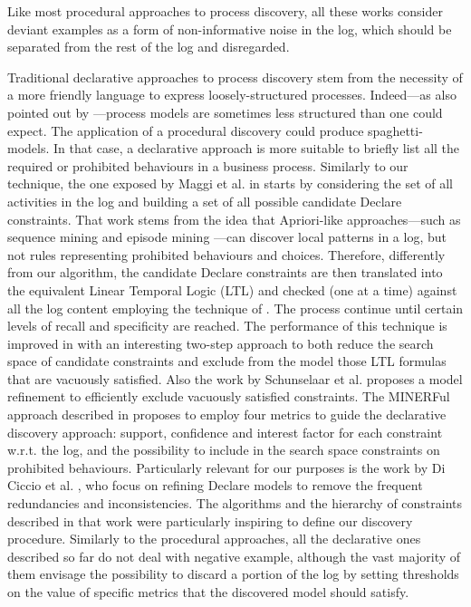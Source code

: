 Like most procedural approaches to process discovery, all these works consider deviant examples as a form of non-informative noise in the log, which should be separated from the rest of the log and disregarded.
 
Traditional declarative approaches to process discovery stem from the necessity of a more friendly language to express loosely-structured processes. Indeed---as also pointed out by \cite{2012-Maggi}---process models are sometimes less structured than one could expect. The application of a procedural discovery could produce spaghetti-models. In that case, a declarative approach is more suitable to briefly list all the required or prohibited behaviours in a business process.
Similarly to our technique, the one exposed by Maggi et al. in \cite{2011-Maggi} starts by considering the set of all activities in the log and building a set of all possible candidate Declare constraints. That work stems from the idea that Apriori-like approaches---such as sequence mining \cite{1994-Agrawal} and episode mining \cite{1997-Mannila}---can discover local patterns in a log, but not rules representing prohibited behaviours and choices. Therefore, differently from our algorithm, the candidate Declare constraints are then translated into the equivalent Linear Temporal Logic (LTL) and checked (one at a time) against all the log content employing the technique of \cite{2005-Aalst}. The process continue until certain levels of recall and specificity are reached. The performance of this technique is improved in \cite{2012-Maggi} with an interesting two-step approach to both reduce the search space of candidate constraints and exclude from the model those LTL formulas that are vacuously satisfied.
Also the work \cite{2012-Schunselaar} by Schunselaar et al. proposes a model refinement to efficiently exclude vacuously satisfied constraints. %
The MINERFul approach described in \cite{2015-DiCiccio} proposes to employ four metrics to guide the declarative discovery approach: support, confidence and interest factor for each constraint w.r.t. the log, and the possibility to include in the search space constraints on prohibited behaviours.
Particularly relevant for our purposes is the work by Di Ciccio et al. \cite{2017-DiCiccio}, who focus on refining Declare models to remove the frequent redundancies and inconsistencies. The algorithms and the hierarchy of constraints described in that work were particularly inspiring to define our discovery procedure.
Similarly to the procedural approaches, all the declarative ones described so far do not deal with negative example, although the vast majority of them envisage the possibility to discard a portion of the log by setting thresholds on the value of specific metrics that the discovered model should satisfy.
 
